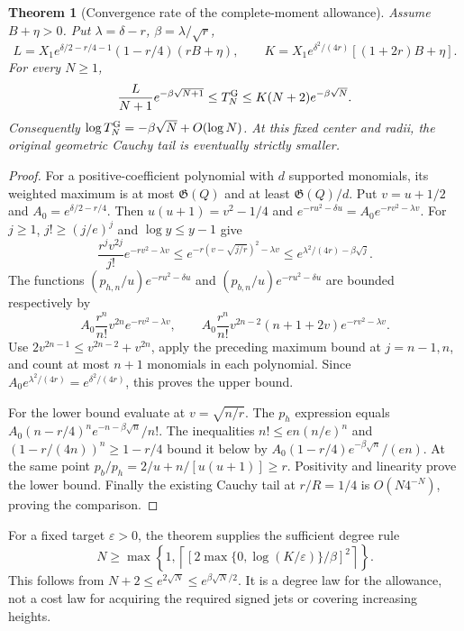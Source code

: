 \documentclass[11pt]{article}
\numberwithin{equation}{section}
\newtheorem{theorem}{Theorem}[section]
\begin{document}
\begin{theorem}[Convergence rate of the complete-moment allowance]
\label{fcg:slackdegree}
Assume $B+\eta>0$. Put $\lambda=\delta-r$, $\beta=\lambda/\sqrt r$,
\[
 L=X_1e^{\delta/2-r/4-1}(1-r/4)(rB+\eta),\qquad
 K=X_1e^{\delta^2/(4r)}[(1+2r)B+\eta].
\]
For every $N\ge1$,
\begin{equation}\label{fcg:twosideddegree}
 \frac{L}{N+1}e^{-\beta\sqrt{N+1}}
 \le T_N^{\rm G}\le K(N+2)e^{-\beta\sqrt N}.
\end{equation}
Consequently $\log T_N^{\rm G}=-\beta\sqrt N+O(\log N)$.
At this fixed center and radii, the original geometric Cauchy tail
is eventually strictly smaller.
\end{theorem}
\begin{proof}
For a positive-coefficient polynomial with $d$ supported monomials,
its weighted maximum is at most $\mathfrak G(Q)$ and at least
$\mathfrak G(Q)/d$. Put $v=u+1/2$ and $A_0=e^{\delta/2-r/4}$.
Then $u(u+1)=v^2-1/4$ and
$e^{-ru^2-\delta u}=A_0e^{-rv^2-\lambda v}$.
For $j\ge1$, $j!\ge(j/e)^j$ and $\log y\le y-1$ give
\[
 \frac{r^jv^{2j}}{j!}e^{-rv^2-\lambda v}
 \le e^{-r(v-\sqrt{j/r})^2-\lambda v}
 \le e^{\lambda^2/(4r)-\beta\sqrt j}.
\]
The functions $(p_{h,n}/u)e^{-ru^2-\delta u}$ and
$(p_{b,n}/u)e^{-ru^2-\delta u}$ are bounded respectively by
\[
 A_0\frac{r^n}{n!}v^{2n}e^{-rv^2-\lambda v},\qquad
 A_0\frac{r^n}{n!}v^{2n-2}(n+1+2v)e^{-rv^2-\lambda v}.
\]
Use $2v^{2n-1}\le v^{2n-2}+v^{2n}$, apply the preceding maximum
bound at $j=n-1,n$, and count at most $n+1$ monomials in each
polynomial. Since $A_0e^{\lambda^2/(4r)}=e^{\delta^2/(4r)}$,
this proves the upper bound.

For the lower bound evaluate at $v=\sqrt{n/r}$. The $p_h$ expression
equals $A_0(n-r/4)^n e^{-n-\beta\sqrt n}/n!$.
The inequalities $n!\le en(n/e)^n$ and
$(1-r/(4n))^n\ge1-r/4$ bound it below by
$A_0(1-r/4)e^{-\beta\sqrt n}/(en)$.
At the same point $p_b/p_h=2/u+n/[u(u+1)]\ge r$.
Positivity and linearity prove the lower bound. Finally the existing
Cauchy tail at $r/R=1/4$ is $O(N4^{-N})$, proving the comparison.
\end{proof}

For a fixed target $\varepsilon>0$, the theorem supplies the sufficient
degree rule
\[
 N\ge\max\left\{1,\left\lceil
  [2\max\{0,\log(K/\varepsilon)\}/\beta]^2
 \right\rceil\right\}.
\]
This follows from $N+2\le e^{2\sqrt N}\le e^{\beta\sqrt N/2}$.
It is a degree law for the allowance, not a cost law for acquiring
the required signed jets or covering increasing heights.
\end{document}
